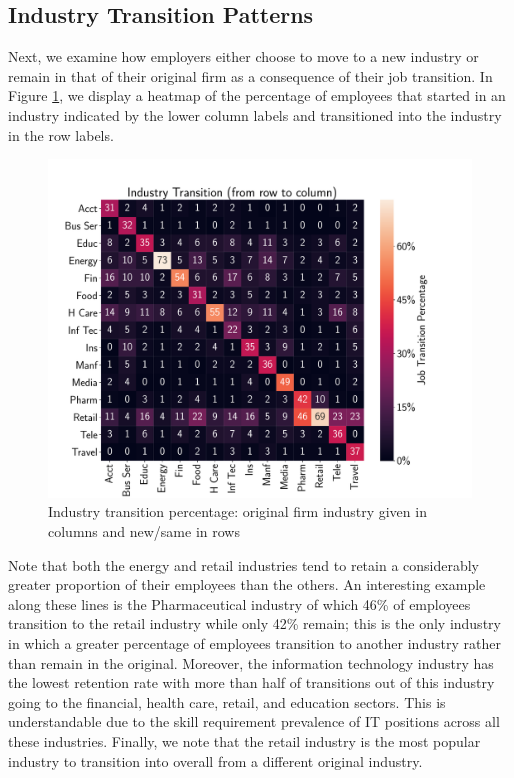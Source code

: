 \documentclass[10pt]{article}
\begin{document}
\subsection{Industry Transition Patterns}

Next, we examine how employers either choose to move to a new industry or remain
in that of their original firm as a consequence of their job transition.  
In Figure \ref{fig:transmat}, we display a heatmap of the percentage of 
employees that started in an industry indicated by the lower column labels and 
transitioned into the industry in the row labels. 
%
\begin{figure}[thb]
    \centering
	\includegraphics[width=1.0\linewidth]{transmat.pdf}
	\caption{Industry transition percentage: original firm 
   industry given in columns and new/same in rows}
	\label{fig:transmat}
\end{figure}
%
Note that both the energy and retail industries tend to retain a considerably 
greater proportion of their employees than the others.  An interesting example 
along these lines is the Pharmaceutical industry of which 46\% of employees 
transition to the retail industry while only 42\% remain; this is the only industry in which 
a greater percentage of employees transition to another industry rather than 
remain in the original.  Moreover, the information technology industry has 
the lowest retention rate with more than half of transitions out of this industry 
going to the financial, health care, retail, and education sectors.  This is understandable 
due to the skill requirement prevalence of IT positions across all these industries.  
Finally, we note that the retail industry is the most popular industry to transition 
into overall from a different original industry.
\end{document}
